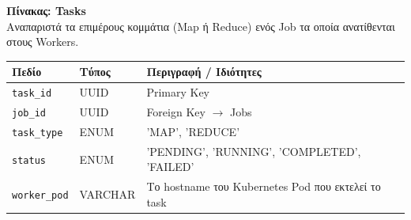 \documentclass[11pt, a4paper]{article}
\begin{document}
\vspace{0.3cm}

\begin{minipage}{\textwidth}
\noindent\textbf{Πίνακας: Tasks} \\
Αναπαριστά τα επιμέρους κομμάτια (Map ή Reduce) ενός Job τα οποία ανατίθενται στους Workers.
\begin{center}
\renewcommand{\arraystretch}{1.2}
\begin{tabularx}{\textwidth}{|l|l|X|}
\hline
\rowcolor{LightBlue}
\textbf{Πεδίο} & \textbf{Τύπος} & \textbf{Περιγραφή / Ιδιότητες} \\ \hline
\texttt{task\_id} & UUID & Primary Key \\ \hline
\texttt{job\_id} & UUID & Foreign Key $\rightarrow$ Jobs \\ \hline
\texttt{task\_type} & ENUM & 'MAP', 'REDUCE' \\ \hline
\texttt{status} & ENUM & 'PENDING', 'RUNNING', 'COMPLETED', 'FAILED' \\ \hline
\texttt{worker\_pod} & VARCHAR & Το hostname του Kubernetes Pod που εκτελεί το task \\ \hline
\end{tabularx}
\end{center}
\end{minipage}
\end{document}
